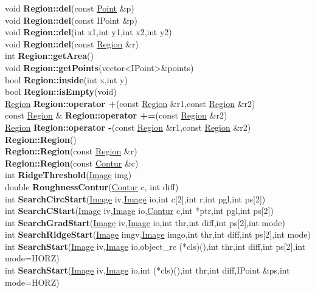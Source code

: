 \documentclass[10pt,titlepage]{article}
\def\functionlistentry#1#2#3#4#5#6{\noindent #1 {\bf #2}(#3) \dotfill #6\\}
\begin{document}
{{\functionlistentry{void}{Region::del}{const \hyperlink{Point}{Point} \&p}{486}{conturs}{}
\functionlistentry{void}{Region::del}{const IPoint \&p}{487}{conturs}{}
\functionlistentry{void}{Region::del}{int x1,int y1,int x2,int y2}{488}{conturs}{}
\functionlistentry{void}{Region::del}{const \hyperlink{Region}{Region} \&r}{489}{conturs}{}
\functionlistentry{int}{Region::getArea}{}{493}{conturs}{}
\functionlistentry{void}{Region::getPoints}{vector\textless {}IPoint\textgreater  \&points}{495}{conturs}{}
\functionlistentry{bool}{Region::inside}{int x,int y}{491}{conturs}{}
\functionlistentry{bool}{Region::isEmpty}{void}{492}{conturs}{}
\functionlistentry{\hyperlink{Region}{Region}}{Region::operator +}{const \hyperlink{Region}{Region} \&r1,const \hyperlink{Region}{Region} \&r2}{484}{conturs}{}
\functionlistentry{const \hyperlink{Region}{Region} \&}{Region::operator +=}{const \hyperlink{Region}{Region} \&r2}{483}{conturs}{}
\functionlistentry{\hyperlink{Region}{Region}}{Region::operator -}{const \hyperlink{Region}{Region} \&r1,const \hyperlink{Region}{Region} \&r2}{490}{conturs}{}
\functionlistentry{}{Region::Region}{}{474}{conturs}{}
\functionlistentry{}{Region::Region}{const \hyperlink{Region}{Region} \&r}{475}{conturs}{}
\functionlistentry{}{Region::Region}{const \hyperlink{Contur}{Contur} \&c}{476}{conturs}{}
\functionlistentry{int}{RidgeThreshold}{\hyperlink{Image}{Image} img}{450}{conturs}{}
\functionlistentry{double}{RoughnessContur}{\hyperlink{Contur}{Contur} c, int diff}{431}{conturs}{}
\functionlistentry{int}{SearchCircStart}{\hyperlink{Image}{Image} iv,\hyperlink{Image}{Image} io,int c[2],int r,int pgl,int ps[2]}{447}{conturs}{}
\functionlistentry{int}{SearchCStart}{\hyperlink{Image}{Image} iv,\hyperlink{Image}{Image} io,\hyperlink{Contur}{Contur} c,int *ptr,int pgl,int ps[2]}{448}{conturs}{}
\functionlistentry{int}{SearchGradStart}{\hyperlink{Image}{Image} iv,\hyperlink{Image}{Image} io,int thr,int diff,int ps[2],int mode}{446}{conturs}{}
\functionlistentry{int}{SearchRidgeStart}{\hyperlink{Image}{Image} imgv,\hyperlink{Image}{Image} imgo,int thr,int diff,int ps[2],int mode}{451}{conturs}{}
\functionlistentry{int}{SearchStart}{\hyperlink{Image}{Image} iv,\hyperlink{Image}{Image} io,object\_rc (*cls)(),int thr,int diff,int ps[2],int mode=HORZ}{438}{conturs}{}
\functionlistentry{int}{SearchStart}{\hyperlink{Image}{Image} iv,\hyperlink{Image}{Image} io,int (*cls)(),int thr,int diff,IPoint \&ps,int mode=HORZ}{439}{conturs}{}

}}
\end{document}
